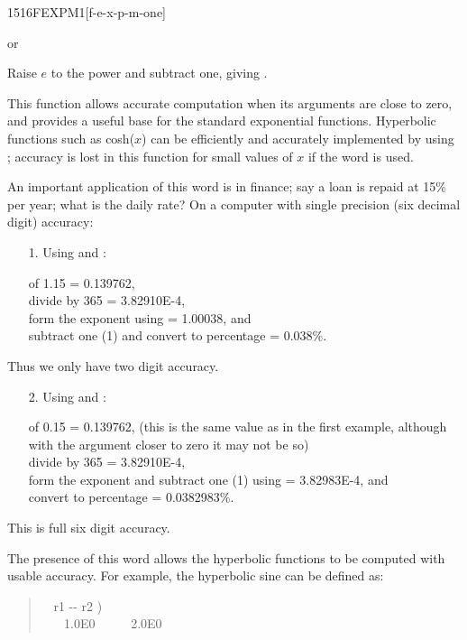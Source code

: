 \begin{worddef}{1516}{FEXPM1}[f-e-x-p-m-one]
\item {} or

	Raise $e$ to the power  and subtract one, giving .

	\begin{rationale} %
		This function allows accurate computation when its arguments
		are close to zero, and provides a useful base for the standard
		exponential functions. Hyperbolic functions such as
		\textsf{cosh($x$)} can be efficiently and accurately
		implemented by using ; accuracy is lost in this
		function for small values of $x$ if the word  is
		used.

		An important application of this word is in finance; say a loan
		is repaid at 15\% per year; what is the daily rate? On a computer
		with single precision (six decimal digit) accuracy:

		\begin{enumerate}
		\item[1.] Using  and :

			 of 1.15 = 0.139762, \\
			divide by 365 = 3.82910E-4, \\
			form the exponent using  = 1.00038, and \\
			subtract one (1) and convert to percentage = 0.038\%.
		\end{enumerate}
		Thus we only have two digit accuracy.
		\begin{enumerate}
		\item[2.] Using  and :

			 of 0.15 = 0.139762, (this is the same value
			as in the first example, although with the argument closer
			to zero it may not be so) \\
			divide by 365 = 3.82910E-4, \\
			form the exponent and subtract one (1) using
			 = 3.82983E-4, and \\
			convert to percentage = 0.0382983\%.
		\end{enumerate}
		This is full six digit accuracy.

		The presence of this word allows the hyperbolic functions to
		be computed with usable accuracy. For example, the hyperbolic
		sine can be defined as:

		\begin{quote}\ttfamily
			\word[core]{:} ~  r1 -{}- r2 ) \\
			\tab {}~ ~
				  1.0E0 \word{F+}~ ~ ~
				 2.0E0 
			\word[core]{;}
		\end{quote}
	\end{rationale}
\end{worddef}

